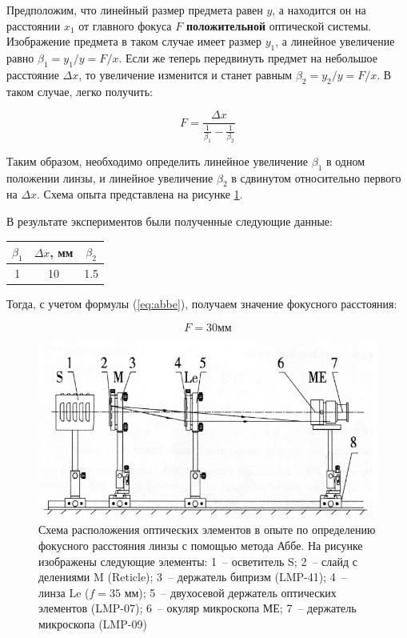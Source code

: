 \documentclass[a4paper, 12pt]{article}
\begin{document}
Предположим, что линейный размер предмета равен $y$, а находится он на расстоянии $x_1$ от главного фокуса $F$ \textbf{положительной} оптической системы. Изображение предмета в таком случае имеет размер $y_1$, а линейное увеличение равно $\beta_1 = y_1 / y = F / x$. Если же теперь передвинуть предмет на небольшое расстояние $\Delta x$, то увеличение изменится и станет равным $\beta_2 = y_2 / y = F / x$. В таком случае, легко получить:

\begin{equation}
	F = \frac{\Delta x}{\frac{1}{\beta_1} - \frac{1}{\beta_2}}
	\label{eq:abbe}
\end{equation}

Таким образом, необходимо определить линейное увеличение $\beta_1$ в одном положении линзы, и линейное увеличение $\beta_2$ в сдвинутом относительно первого на $\Delta x$. Схема опыта представлена на рисунке \ref{fig:2}.

В результате экспериментов были полученные следующие данные:

\begin{center}
	\begin{tabular}{|c|c|c|}
		\hline
		$\beta_1$ & $\Delta x$, мм & $\beta_2$ \\
		\hline
		1 & 10 & 1.5 \\
		\hline
	\end{tabular}
\end{center}

Тогда, с учетом формулы (\ref{eq:abbe}), получаем значение фокусного расстояния:

\begin{equation*} %
	\boxed{
	F = 30 \text{мм}}
\end{equation*}

\begin{figure}[H]
	\centering
	\includegraphics[width=0.7\linewidth]{scheme_3}
	\caption{Схема расположения оптических элементов в опыте по определению фокусного расстояния линзы с помощью метода Аббе. На рисунке изображены следующие элементы: 1~-- осветитель S; 2~-- слайд с делениями M (Reticle); 3~-- держатель бипризм (LMP-41); 4~-- линза Le ($f=35$ мм); 5~-- двухосевой держатель оптических элементов (LMP-07); 6~-- окуляр микроскопа МЕ; 7~-- держатель микроскопа (LMP-09)}
	\label{fig:2}
\end{figure}
\end{document}
